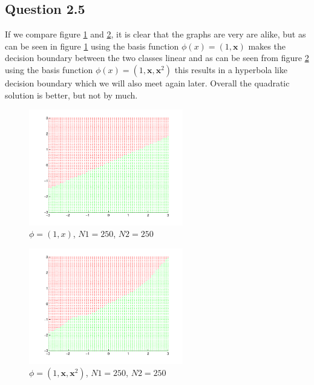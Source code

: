 \subsection*{Question 2.5}

If we compare figure \ref{fig:q25a} and \ref{fig:q25b}, it is clear
that the graphs are very are alike, but as can be seen in
figure \ref{fig:q25a} using the basis function $\phi(x) =
(1, \mathbf{x})$ makes the decision boundary between the two classes
linear and as can be seen from figure \ref{fig:q25b} using the basis
function $\phi(x) = (1, \mathbf{x}, \mathbf{x}^2)$ this results in a
hyperbola like decision boundary which we will also meet again
later. Overall the quadratic solution is better, but not by much.

\begin{figure}[!htbp]
  \centering
  \includegraphics[width=0.6\textwidth]{./images/q25a.pdf}
  \caption{$\phi = (1,x)$, $N1 = 250$, $N2 = 250$}
  \label{fig:q25a}
\end{figure}

\begin{figure}[!htbp]
  \centering
  \includegraphics[width=0.6\textwidth]{./images/q25b.pdf}
  \caption{$\phi = (1,\mathbf{x}, \mathbf{x}^2)$, $N1 = 250$, $N2 = 250$}
  \label{fig:q25b}
\end{figure}
